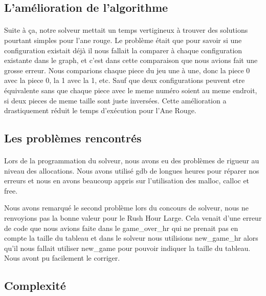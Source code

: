 \documentclass {article}
\begin{document}
\subsection{L'amélioration de l'algorithme}
\paragraph{}
Suite à ça, notre solveur mettait un temps vertigineux à trouver des solutions pourtant simples pour l'ane rouge. Le problème était que pour savoir si une configuration existait déjà il nous fallait la comparer à chaque configuration existante dans le graph, et c'est dans cette comparaison que nous avions fait une grosse erreur. Nous comparions chaque piece du jeu une à une, donc la piece 0 avec la piece 0, la 1 avec la 1, etc. Sauf que deux configurations peuvent etre équivalente sans que chaque piece avec le meme numéro soient au meme endroit, si deux pieces de meme taille sont juste inversées. Cette amélioration a drastiquement réduit le temps d'exécution pour l'Ane Rouge.

\subsection{Les problèmes rencontrés}
\paragraph{}
Lors de la programmation du solveur, nous avons eu des problèmes de rigueur au niveau des allocations. Nous avons utilisé gdb de longues heures pour réparer nos erreurs et nous en avons beaucoup appris sur l'utilisation des malloc, calloc et free.

Nous avons remarqué le second problème lors du concours de solveur, nous ne renvoyions pas la bonne valeur pour le Rush Hour Large. Cela venait d'une erreur de code que nous avions faite dans le game\_over\_hr qui ne prenait pas en compte la taille du tableau et dans le solveur nous utilisions new\_game\_hr alors qu'il nous fallait utiliser new\_game pour pouvoir indiquer la taille du tableau. Nous avont pu facilement le corriger.

\subsection{Complexité}
\end{document}
